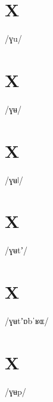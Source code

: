 \documentclass[10pt,a4paper,twoside]{book}
\begin{document}
\section*{X}

\begin{multicols}{3}
 {/ɣu/} {}
\end{multicols}

\section*{X}

\begin{multicols}{3}
 {/ɣʉ/} {}
\end{multicols}

\section*{X}

\begin{multicols}{3}
 {/ɣʉǀ/} {}
\end{multicols}

\section*{X}

\begin{multicols}{3}
 {/ɣʉtʼ/} {}
\end{multicols}

\section*{X}

\begin{multicols}{3}
 {/ɣʉtʼɒbˈʁɶ/} {}
\end{multicols}

\section*{X}

\begin{multicols}{3}
 {/ɣʉp/} {}
\end{multicols}
\end{document}
